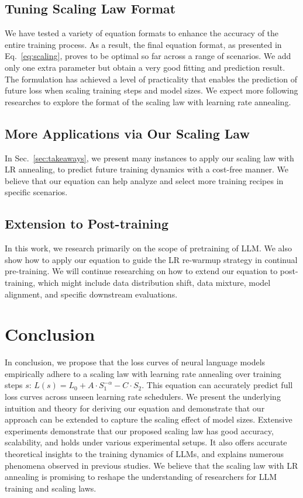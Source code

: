 \documentclass{article} %
\begin{document}
\subsection{Tuning Scaling Law Format}
We have tested a variety of equation formats to enhance the accuracy of the entire training process. As a result, the final equation format, as presented in Eq.~\ref{eq:scaling}, proves to be optimal so far
across a range of scenarios. 
We add only one extra parameter but obtain a very good fitting and prediction result.
The formulation has achieved a level of practicality that enables the prediction of future loss when scaling training steps and model sizes. We expect more following researches to explore the format of the scaling law with learning rate annealing.

\subsection{More Applications via Our Scaling Law}
In Sec.~\ref{sec:takeaways}, we present many instances to apply our scaling law with LR annealing, to predict future training dynamics with a cost-free manner.
We believe that our equation can help analyze and select more training recipes in specific scenarios.

\subsection{Extension to Post-training}
In this work, we research primarily on the scope of pretraining of LLM. We also show how to apply our equation to guide the LR re-warmup strategy in continual pre-training. We will continue researching on how to extend our equation to post-training, which might include data distribution shift, data mixture, model alignment, and specific downstream evaluations.


\section{Conclusion}
In conclusion, we propose that the loss curves of neural language models empirically adhere to a scaling law with learning rate annealing over training steps $s$: $L(s) = L_0 + A\cdot S_1^{-\alpha} - C\cdot S_{2}$.  
This equation can accurately predict full loss curves across unseen learning rate schedulers.
We present the underlying intuition and theory for deriving our equation and demonstrate that our approach can be extended to capture the scaling effect of model sizes.
Extensive experiments demonstrate that our proposed scaling law has good accuracy, scalability, and holds under various experimental setups.
It also offers accurate theoretical insights to the training dynamics of LLMs,
and explains numerous phenomena observed in previous studies. We believe that the scaling law with LR annealing is promising to reshape the understanding of researchers for LLM training and scaling laws.




\newpage
\appendix

\end{document}
